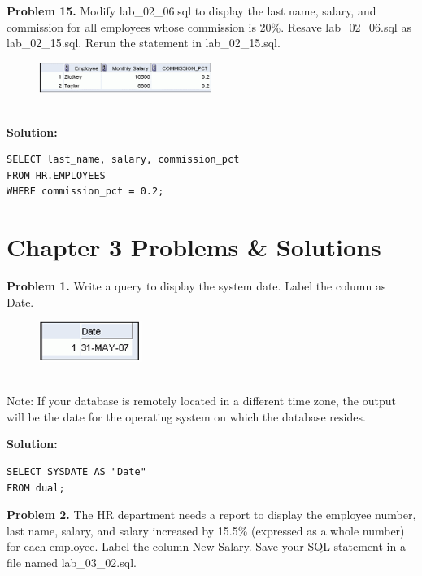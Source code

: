 \documentclass[12pt,a4paper]{article}
\begin{document}
\vspace{0.5cm}

\textbf{Problem 15.} Modify lab\_02\_06.sql to display the last name, salary, and commission for all employees whose commission is 20\%. Resave lab\_02\_06.sql as lab\_02\_15.sql. Rerun the statement in lab\_02\_15.sql.
\begin{figure}[htbp]
  \centering
  \includegraphics[width=0.5\textwidth]{Screenshots/215.png}
\end{figure}\\
\textbf{Solution:}
\begin{lstlisting}[style=sqlstyle]
SELECT last_name, salary, commission_pct
FROM HR.EMPLOYEES
WHERE commission_pct = 0.2;
\end{lstlisting}

\vspace{0.5cm}

\section{Chapter 3 Problems \& Solutions}

\textbf{Problem 1.} Write a query to display the system date. Label the column as Date.
\begin{figure}[htbp]
  \centering
  \includegraphics[width=0.3\textwidth]{Screenshots/31.png}
\end{figure}\\
Note: If your database is remotely located in a different time zone, the output will be the date for the operating system on which the database resides.

\textbf{Solution:}
\begin{lstlisting}[style=sqlstyle]
SELECT SYSDATE AS "Date"
FROM dual;
\end{lstlisting}

\vspace{0.5cm}

\textbf{Problem 2.} The HR department needs a report to display the employee number, last name, salary, and salary increased by 15.5\% (expressed as a whole number) for each employee. Label the column New Salary. Save your SQL statement in a file named lab\_03\_02.sql.
\end{document}
